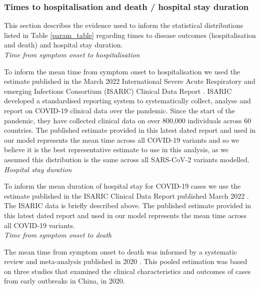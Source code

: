 \subsubsection{Times to hospitalisation and death / hospital stay duration}
This section describes the evidence used to inform the statistical distributions listed in Table \ref{param_table}
regarding times to disease outcomes (hospitalisation and death) and hospital stay duration.\\

\textit{Time from symptom onset to hospitalisation}

To inform the mean time from symptom onset to hospitalisation we used the estimate published in the March 2022 International Severe Acute Respiratory 
and emerging Infections Consortium (ISARIC) Clinical Data Report \cite{isaric2022}. ISARIC developed a standardised reporting system to systematically 
collect, analyse and report on COVID-19 clinical data over the pandemic. Since the start of the pandemic, they have collected clinical data on over 
800,000 individuals across 60 countries. The published estimate provided in this latest dated report and used in our model represents the mean time 
across all COVID-19 variants and so we believe it is the best representative estimate to use in this analysis, as we assumed this distribution is the 
same across all SARS-CoV-2 variants modelled.\\

\textit{Hospital stay duration}

To inform the mean duration of hospital stay for COVID-19 cases we use the estimate published in the ISARIC Clinical Data Report published March 2022 \cite{isaric2022}. 
The ISARIC data is briefly described above. The published estimate provided in this latest dated report and used in our model represents the mean time across all COVID-19 
variants.\\

\textit{Time from symptom onset to death}

The mean time from symptom onset to death was informed by a systematic review and meta-analysis published in 2020 \cite{khalili2020}. This pooled estimation was based on three studies 
that examined the clinical characteristics and outcomes of cases from early outbreaks in China, in 2020.


